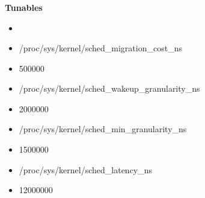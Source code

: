 \documentclass[usenames,dvipsnames, 18pt, compress, aspectratio=169]{beamer}
\begin{document}
\begin{frame}
    \frametitle{}
    \begin{center}
    \textbf{Tunables}

        \begin{itemize}
            \item <+->
        \end{itemize}

        \begin{itemize}[label={\MVRightarrow}]
            \item <+-> /proc/sys/kernel/sched\_migration\_cost\_ns
            \item <+-> 500000
            \item <+-> /proc/sys/kernel/sched\_wakeup\_granularity\_ns
            \item <+-> 2000000
            \item <+-> /proc/sys/kernel/sched\_min\_granularity\_ns
            \item <+-> 1500000
            \item <+-> /proc/sys/kernel/sched\_latency\_ns
            \item <+-> 12000000
        \end{itemize}

    \end{center}
\end{frame}
\end{document}

